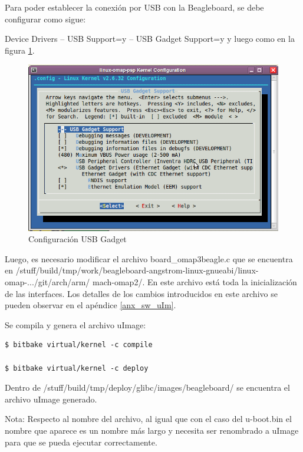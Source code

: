 Para poder establecer la conexión por USB con la Beagleboard, se debe configurar como sigue: 

Device Drivers – USB Support=y – USB Gadget Support=y y luego como en la figura \ref{Fig:usb}.

\begin{figure}[H]
\centering
  \begin{center}
  \includegraphics[scale=.4]{Imagenes/usb_chica.png} 
  \end{center}
  \caption{Configuración USB Gadget}\label{Fig:usb} 
\end{figure}

Luego, es necesario modificar el archivo board\_omap3beagle.c que se encuentra en /stuff/build/tmp/work/beagleboard-angstrom-linux-gnueabi/linux-omap-.../git/arch/arm/
mach-omap2/. En este archivo está toda la inicialización de las interfaces. Los detalles de los cambios introducidos en este archivo se pueden observar en el apéndice \ref{anx_sw_uIm}.

\bigskip
Se compila y genera el archivo uImage:

\bigskip
\begin{verbatim}
$ bitbake virtual/kernel -c compile

$ bitbake virtual/kernel -c deploy
\end{verbatim}

\bigskip
Dentro de /stuff/build/tmp/deploy/glibc/images/beagleboard/ se encuentra el archivo uImage generado.

\bigskip
Nota: Respecto al nombre del archivo, al igual que con el caso del u-boot.bin el nombre que aparece es un nombre más largo y necesita ser renombrado a uImage para que se pueda ejecutar correctamente.

